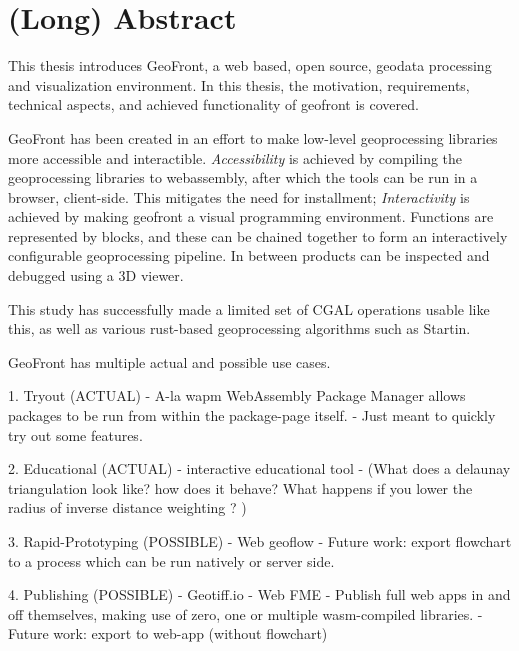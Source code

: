 
\chapter*{ (Long) Abstract }

This thesis introduces GeoFront, a web based, open source, geodata processing and visualization environment. 
In this thesis, the motivation, requirements, technical aspects, and achieved functionality of geofront is covered. 

GeoFront has been created in an effort to make low-level geoprocessing libraries more accessible and interactible.
\emph{Accessibility} is achieved by compiling the geoprocessing libraries to webassembly, after which the tools can be run in a browser, client-side. 
This mitigates the need for installment; 
\emph{Interactivity} is achieved by making geofront a visual programming environment. 
Functions are represented by blocks, and these can be chained together to form an interactively configurable geoprocessing pipeline. 
In between products can be inspected and debugged using a 3D viewer. 

This study has successfully made a limited set of CGAL operations usable like this, as well as various rust-based geoprocessing algorithms such as Startin.

GeoFront has multiple actual and possible use cases. 

1. Tryout (ACTUAL)
   - A-la wapm WebAssembly Package Manager allows packages to be run from within the package-page itself. 
  - Just meant to quickly try out some features.

2. Educational (ACTUAL)
   - interactive educational tool
   - (What does a delaunay triangulation look like? how does it behave? What happens if you lower the radius of inverse distance weighting ? )

3. Rapid-Prototyping (POSSIBLE)
   - Web geoflow
   - Future work: export flowchart to a process which can be run natively or server side.

4. Publishing (POSSIBLE)
   - Geotiff.io
   - Web FME 
   - Publish full web apps in and off themselves, making use of zero, one or multiple wasm-compiled libraries.  
   - Future work: export to web-app (without flowchart)

